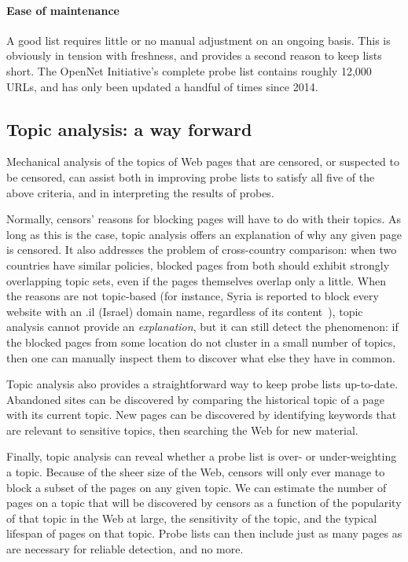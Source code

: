 \paragraph{Ease of maintenance} A good list requires little or no
manual adjustment on an ongoing basis.  This is obviously in tension
with freshness, and provides a second reason to keep lists short.  The
OpenNet Initiative's complete probe list contains roughly 12,000 URLs,
and has only been updated a handful of times since 2014.

\subsection{Topic analysis: a way forward}

Mechanical analysis of the topics of Web pages that are censored, or
suspected to be censored, can assist both in improving probe lists to
satisfy all five of the above criteria, and in interpreting the
results of probes.

Normally, censors' reasons for blocking pages will have to do with
their topics.  As long as this is the case, topic analysis offers an
explanation of why any given page is censored.  It also addresses the
problem of cross-country comparison: when two countries have similar
policies, blocked pages from both should exhibit strongly overlapping
topic sets, even if the pages themselves overlap only a little.  When
the reasons are not topic-based (for instance, Syria is reported to block
every website with an {\UrlFont .il} (Israel) domain name, regardless
of its content~\cite{chaabane.2014.syria}), topic analysis cannot
provide an \emph{explanation}, but it can still detect the phenomenon:
if the blocked pages from some location do not cluster in a small
number of topics, then one can manually inspect them to discover what
else they have in common.

Topic analysis also provides a straightforward way to keep probe lists
up-to-date.  Abandoned sites can be discovered by comparing the
historical topic of a page with its current topic.  New pages can be
discovered by identifying keywords that are relevant to sensitive
topics, then searching the Web for new material.

Finally, topic analysis can reveal whether a probe list is over- or
under-weighting a topic.  Because of the sheer size of the Web,
censors will only ever manage to block a subset of the pages on any
given topic.  We can estimate the number of pages on a topic that will
be discovered by censors as a function of the popularity of that topic
in the Web at large, the sensitivity of the topic, and the typical
lifespan of pages on that topic.  Probe lists can then include just as
many pages as are necessary for reliable detection, and no more.

